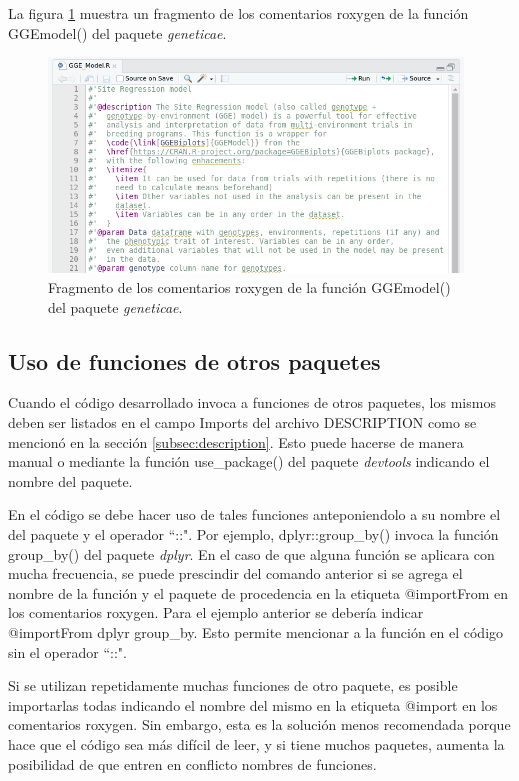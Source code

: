 La figura \ref{fig:fig35} muestra un fragmento de los comentarios roxygen de la función \textcolor{fandango}{GGEmodel()} del paquete \emph{geneticae}.

\begin{figure}[h]
	\begin{center}
		\includegraphics[width=11cm]{./Graficos/COMENTARIOSROXYGEN.png}	
	\end{center}
	\caption{Fragmento de los comentarios roxygen de la función \textcolor{fandango}{GGEmodel()} del paquete \emph{geneticae}.}
	\label{fig:fig35}
\end{figure}


\subsection{Uso de funciones de otros paquetes}
Cuando el código desarrollado invoca a funciones de otros paquetes, los mismos deben ser listados en el campo Imports del archivo DESCRIPTION como se mencionó en la sección \ref{subsec:description}. Esto puede hacerse de manera manual o mediante la función \textcolor{fandango}{use\_package()} del paquete \emph{devtools} indicando el nombre del paquete.

En el código se debe hacer uso de tales funciones anteponiendolo a su nombre el del paquete y el operador ``::". Por ejemplo, \textcolor{fandango}{dplyr::group\_by()} invoca la función \textcolor{fandango}{group\_by()} del paquete \emph{dplyr}. En el caso de que alguna función se aplicara con mucha frecuencia, se puede prescindir del comando anterior si se agrega el nombre de la función y el paquete de procedencia en la etiqueta @importFrom en los comentarios roxygen. Para el ejemplo anterior se debería indicar @importFrom dplyr group\_by. Esto permite mencionar a la función en el código sin el operador ``::".

Si se utilizan repetidamente muchas funciones de otro paquete, es posible importarlas todas indicando el nombre del mismo en la etiqueta @import en los comentarios roxygen. Sin embargo, esta es la solución menos recomendada porque hace que el código sea más difícil de leer, y si tiene muchos paquetes, aumenta la posibilidad de que entren en conflicto nombres de funciones.

